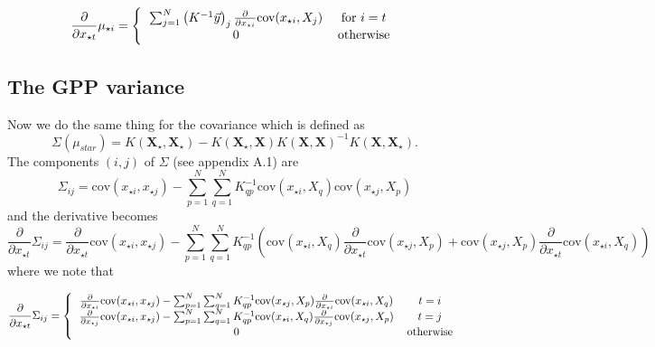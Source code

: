 \documentclass[phd,tocprelim]{cornell}
\begin{document}
\begin{equation}
\frac{\partial}{\partial x_{\star t}} \mu_{\star i} = \left\{ \begin{tabular}{cc}
                                                                  $\sum_{j = 1}^{N} \left(K^{-1} \vec{y} \right)_{j} \frac{\partial}{\partial x_{\star i}} \mbox{cov}(x_{\star i}, X_{j})$ & for $i = t$ \\
								  0 & otherwise
                                                                 \end{tabular}\right.
\end{equation}


\subsection{The GPP variance}

Now we do the same thing for the covariance which is defined as
\begin{equation}
 \Sigma(\mu_{star}) = K(\textbf{X$_{\star}$}, \textbf{X$_{\star}$}) - K(\textbf{X$_{\star}$}, \textbf{X}) K(\textbf{X}, \textbf{X})^{-1} K(\textbf{X}, \textbf{X$_{\star}$}).
\end{equation}
The components $(i,j)$ of $\Sigma$ (see appendix A.1) are
\begin{equation}
 \Sigma_{ij} = \mbox{cov}(x_{\star i}, x_{\star j}) - \sum_{p = 1}^{N} \sum_{q = 1}^{N} K^{-1}_{qp} \mbox{cov}(x_{\star i}, X_{q}) \mbox{cov}(x_{\star j}, X_{p})
\end{equation}
and the derivative becomes
\begin{equation}
 \frac{\partial}{\partial x_{\star t}} \Sigma_{ij} = \frac{\partial}{\partial x_{\star t}} \mbox{cov}(x_{\star i}, x_{\star j}) - \sum_{p = 1}^{N} \sum_{q = 1}^{N} K^{-1}_{qp} \left( \mbox{cov}(x_{\star i}, X_{q}) \frac{\partial}{\partial x_{\star t}} \mbox{cov}(x_{\star j}, X_{p}) + \mbox{cov}(x_{\star j}, X_{p}) \frac{\partial}{\partial x_{\star t}} \mbox{cov}(x_{\star i}, X_{q}) \right)
\end{equation}
where we note that

\begin{equation}
  \frac{\partial}{\partial x_{\star t}} \Sigma_{ij} = \left\{ \begin{tabular}{cc}
                                                       $\frac{\partial}{\partial x_{\star i}} \mbox{cov}(x_{\star i}, x_{\star j}) - \sum_{p = 1}^{N} \sum_{q = 1}^{N} K^{-1}_{qp} \mbox{cov}(x_{\star j}, X_{p}) \frac{\partial}{\partial x_{\star i}} \mbox{cov}(x_{\star i}, X_{q})$ & $t = i$ \\
							$\frac{\partial}{\partial x_{\star j}} \mbox{cov}(x_{\star i}, x_{\star j}) - \sum_{p = 1}^{N} \sum_{q = 1}^{N} K^{-1}_{qp} \mbox{cov}(x_{\star i}, X_{q}) \frac{\partial}{\partial x_{\star j}} \mbox{cov}(x_{\star j}, X_{p})$ & $t = j$ \\
							$0$ & otherwise
                                                      \end{tabular} \right.
\end{equation}
\end{document}
